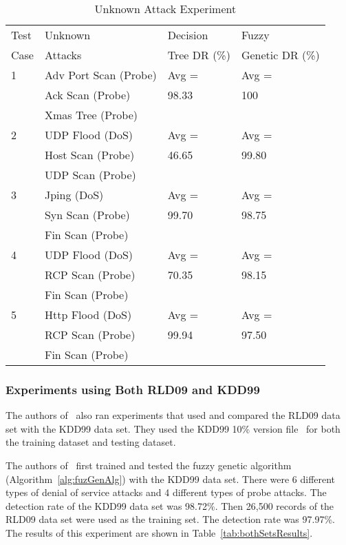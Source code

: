\documentclass{sig-alternate}
\begin{document}
\begin{table}
\caption{Unknown Attack Experiment}
\vspace{0.20cm}
\begin{tabular}{llll}
Test & Unknown & Decision & Fuzzy\\
Case & Attacks & Tree DR (\%)  & Genetic DR (\%)\\ \hline

1 & Adv Port Scan (Probe) & Avg = & Avg =\\
  & Ack Scan (Probe)		  & 98.33 & 100\\
  & Xmas Tree (Probe)		  &		  &\\ \hline

2 & UDP Flood (DoS) & Avg = & Avg =\\
  & Host Scan (Probe) & 46.65 & 99.80\\
  & UDP Scan (Probe)  &       &\\ \hline

3 & Jping (DoS)    & Avg =          & Avg =\\
  & Syn Scan (Probe) & 99.70 & 98.75\\
  & Fin Scan (Probe) &                &\\ \hline

4 & UDP Flood (DoS) & Avg = & Avg =\\
  & RCP Scan (Probe)  & 70.35 & 98.15\\
  & Fin Scan (Probe)  &       &\\ \hline

5 & Http Flood (DoS) & Avg =          & Avg =\\
  & RCP Scan (Probe)  & 99.94 & 97.50\\
  & Fin Scan (Probe) &                &\\
\hline\end{tabular}
\label{tab:fuzGenExp2}
\end{table}




\subsubsection{Experiments using Both RLD09 and KDD99}
The authors of~\cite{6496342, 6559603} also ran experiments that used and compared the RLD09 data set with the KDD99 data set. They used the KDD99 10\% version file~\cite{KDD99} for both the training dataset and testing dataset.

The authors of~\cite{6496342, 6559603} first trained and tested the fuzzy genetic algorithm (Algorithm~\ref{alg:fuzGenAlg}) with the KDD99 data set. There were 6 different types of denial of service attacks and 4 different types of probe attacks. The detection rate of the KDD99 data set was 98.72\%. Then 26,500 records of the RLD09 data set were used as the training set. The detection rate was 97.97\%. The results of this experiment are shown in Table~\ref{tab:bothSetsResults}.
\end{document}
